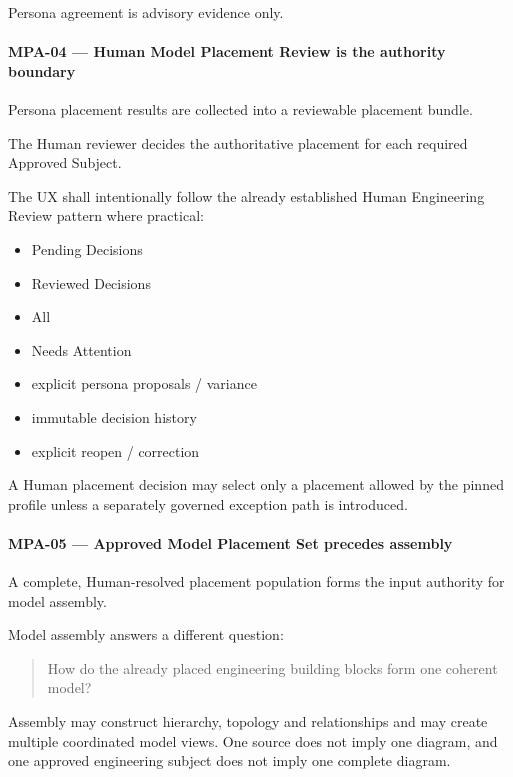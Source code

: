 Persona agreement is advisory evidence only.

\hypertarget{mpa-04--human-model-placement-review-is-the-authority-boundary}{%
\paragraph{MPA-04 --- Human Model Placement Review is the authority boundary}\label{mpa-04--human-model-placement-review-is-the-authority-boundary}}

Persona placement results are collected into a reviewable placement bundle.

The Human reviewer decides the authoritative placement for each required Approved Subject.

The UX shall intentionally follow the already established Human Engineering Review pattern where practical:

\begin{itemize}
\tightlist
\item
  Pending Decisions
\item
  Reviewed Decisions
\item
  All
\item
  Needs Attention
\item
  explicit persona proposals / variance
\item
  immutable decision history
\item
  explicit reopen / correction
\end{itemize}

A Human placement decision may select only a placement allowed by the pinned profile unless a separately governed exception path is introduced.

\hypertarget{mpa-05--approved-model-placement-set-precedes-assembly}{%
\paragraph{MPA-05 --- Approved Model Placement Set precedes assembly}\label{mpa-05--approved-model-placement-set-precedes-assembly}}

A complete, Human-resolved placement population forms the input authority for model assembly.

Model assembly answers a different question:

\begin{quote}
How do the already placed engineering building blocks form one coherent model?
\end{quote}

Assembly may construct hierarchy, topology and relationships and may create multiple coordinated model views. One source does not imply one diagram, and one approved engineering subject does not imply one complete diagram.

